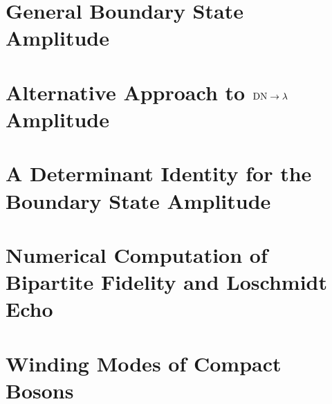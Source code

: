 \documentclass[reprint, prb]{revtex4-1}
\begin{document}
\section{General Boundary State Amplitude}
\label{app:lambda_12}


\section{Alternative Approach to ${\rm DN} \rightarrow \lambda$ Amplitude}
\label{app:gnd_dn_lambda}


\section{A Determinant Identity for the Boundary State Amplitude}
\label{app:pf_of_id}


\section{Numerical Computation of Bipartite Fidelity and Loschmidt Echo}
\label{app:comp_fid_echo}


\section{Winding Modes of Compact Bosons}
\label{app:compact_diff_boson}




\end{document}
